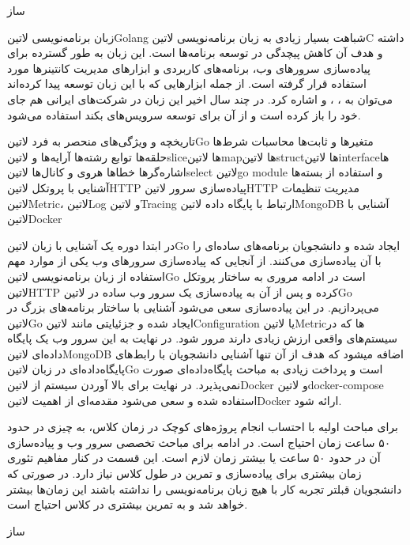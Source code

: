 \documentclass[]{description}
\begin{document}
‌ساز


زبان برنامه‌نویسی ‌لاتین{Golang} شباهت بسیار زیادی به زبان برنامه‌نویسی ‌لاتین{C} داشته و هدف آن کاهش پیچدگی در توسعه برنامه‌ها است.
این زبان به طور گسترده برای پیاده‌سازی سرور‌های وب، برنامه‌های کاربردی و ابزارهای مدیریت کانتینرها مورد استفاده قرار گرفته است.
از جمله ابزارهایی که با این زبان توسعه پیدا کرده‌اند می‌توان به
،
،
و  اشاره کرد.
در چند سال اخیر این زبان در شرکت‌های ایرانی هم جای خود را باز کرده است و از آن برای توسعه سرویس‌های بکند استفاده می‌شود.


 تاریخچه و ویژگی‌های منحصر به فرد ‌لاتین{Go}
 متغیرها و ثابت‌ها
 محاسبات
 شرط‌ها
 حلقه‌ها
 توابع
 رشته‌ها
 آرایه‌ها و ‌لاتین{slice}ها
 ‌لاتین{map}ها
 ‌لاتین{struct}ها
 ‌لاتین{interface}ها
 اشاره‌گرها
 خطاها
 هروی و کانال‌ها
 ‌لاتین{select}
 ‌لاتین{go module} و استفاده از بسته‌ها
 آشنایی با پروتکل ‌لاتین{HTTP}
 پیاده‌سازی سرور ‌لاتین{HTTP}
 مدیریت تنظیمات
 ‌لاتین{Metric}، ‌لاتین{Log} و ‌لاتین{Tracing}
 ارتباط با پایگاه داده ‌لاتین{MongoDB}
 آشنایی با ‌لاتین{Docker}

در ابتدا دوره یک آشنایی با زبان ‌لاتین{Go} ایجاد شده و دانشجویان برنامه‌های ساده‌ای را با آن پیاده‌سازی می‌کنند. از آنجایی که پیاده‌سازی سرورهای وب
یکی از موارد مهم استفاده از زبان برنامه‌نویسی ‌لاتین{Go} است در ادامه مروری به ساختار پروتکل ‌لاتین{HTTP} کرده و پس از آن به پیاده‌سازی یک سرور وب ساده
در ‌لاتین{Go} می‌پردازیم. در این پیاده‌سازی سعی می‌شود آشنایی با ساختار برنامه‌های بزرگ در ‌لاتین{Go} ایجاد شده و جزئیایتی مانند ‌لاتین{Configuration} یا ‌لاتین{Metric}ها
که در سیستم‌های واقعی ارزش زیادی دارند مرور شود. در نهایت به این سرور وب یک پایگاه داده‌ای ‌لاتین{MongoDB} اضافه میشود که هدف از آن تنها آشنایی دانشجویان با رابط‌های پایگاه‌داده‌ای در زبان ‌لاتین{Go}
است و پرداخت زیادی به مباحث پایگاه‌داده‌ای صورت نمی‌پذیرد.
در نهایت برای بالا آوردن سیستم از ‌لاتین{Docker} و ‌لاتین{docker-compose} استفاده شده و سعی می‌شود مقدمه‌ای از اهمیت ‌لاتین{Docker} ارائه شود.


برای مباحث اولیه با احتساب انجام پروژه‌های کوچک در زمان کلاس، به چیزی در حدود ۵۰ ساعت زمان احتیاج است.
در ادامه برای مباحث تخصصی سرور وب و پیاده‌سازی آن در حدود ۵۰ ساعت یا بیشتر زمان لازم است. این قسمت در کنار مفاهیم تئوری
زمان بیشتری برای پیاده‌سازی و تمرین در طول کلاس نیاز دارد.
در صورتی که دانشجویان قبلتر تجربه کار با هیچ زبان برنامه‌نویسی را نداشته باشند این زمان‌ها بیشتر خواهد شد و به تمرین بیشتری در کلاس احتیاج است.

‌ساز
\end{document}
